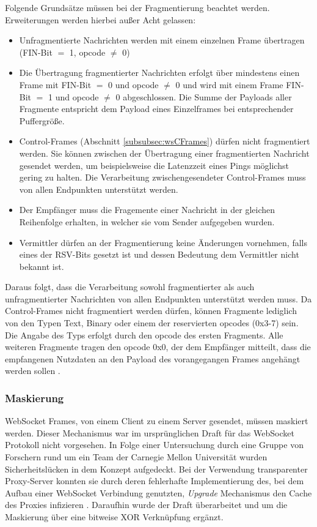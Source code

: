 \documentclass[11pt,a4paper,titlepage]{scrartcl}
\numberwithin{equation}{section}
\begin{document}
\noindent Folgende Grundsätze müssen bei der Fragmentierung beachtet werden. Erweiterungen werden hierbei außer Acht gelassen:
\begin{itemize}
	\item Unfragmentierte Nachrichten werden mit einem einzelnen Frame übertragen (FIN-Bit $=$ 1,  opcode $\neq$ 0)  
	\item Die Übertragung fragmentierter Nachrichten erfolgt über mindestens einen Frame mit FIN-Bit $=$ 0 und opcode $\neq$ 0 und wird mit einem Frame FIN-Bit $=$ 1 und opcode $\neq$ 0 abgeschlossen. Die Summe der Payloads aller Fragmente entspricht dem Payload eines Einzelframes bei entsprechender Puffergröße.
	\item Control-Frames (Abschnitt \ref{subsubsec:wsCFrames}) dürfen nicht fragmentiert werden. Sie können zwischen der Übertragung einer fragmentierten Nachricht gesendet werden, um beispielsweise die Latenzzeit eines Pings möglichst gering zu halten. Die Verarbeitung zwischengesendeter Control-Frames muss von allen Endpunkten unterstützt werden.
	\item Der Empfänger muss die Fragemente einer Nachricht in der gleichen Reihenfolge erhalten, in welcher sie vom Sender aufgegeben wurden.
	\item Vermittler dürfen an der Fragmentierung keine Änderungen vornehmen, falls eines der RSV-Bits gesetzt ist und dessen Bedeutung dem Vermittler nicht bekannt ist.
\end{itemize}

\noindent Daraus folgt, dass die Verarbeitung sowohl fragmentierter als auch unfragmentierter Nachrichten von allen Endpunkten unterstützt werden muss. Da Control-Frames nicht fragmentiert werden dürfen, können Fragmente lediglich von den Typen Text, Binary oder einem der reservierten opcodes (0x3-7) sein. Die Angabe des Typs erfolgt durch den opcode des ersten Fragments. Alle weiteren Fragmente tragen den opcode 0x0, der dem Empfänger mitteilt, dass die empfangenen Nutzdaten an den Payload des vorangegangen Frames angehängt werden sollen \autocite{shepherd_writing_2017}.
\subsubsection*{Maskierung}\label{subsubsec:wsMasking}
WebSocket Frames, von einem Client zu einem Server gesendet, müssen maskiert werden. Dieser Mechanismus war im ursprünglichen Draft für das WebSocket Protokoll nicht vorgesehen. In Folge einer Untersuchung durch eine Gruppe von Forschern rund um ein Team der Carnegie Mellon Universität wurden Sicherheitslücken in dem Konzept aufgedeckt. Bei der Verwendung  transparenter Proxy-Server konnten sie durch deren fehlerhafte Implementierung des, bei dem Aufbau einer WebSocket Verbindung genutzten, \textit{Upgrade} Mechanismus den Cache des Proxies infizieren \autocite{huang_talking_2011}. Daraufhin wurde der Draft überarbeitet und um die Maskierung über eine bitweise XOR Verknüpfung ergänzt. \\
\end{document}
